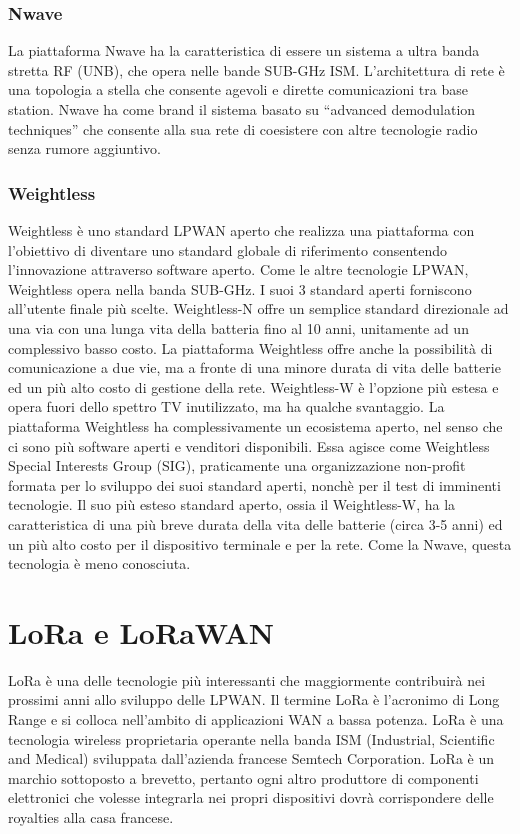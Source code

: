 \documentclass[12pt,a4paper,openright,twoside]{report}
\begin{document}
\subsection{Nwave}
La piattaforma Nwave ha la caratteristica di essere un sistema a ultra banda stretta RF (UNB), che opera nelle bande SUB-GHz ISM. 
L'architettura di rete \`e una topologia a stella che consente agevoli e dirette comunicazioni tra base station. Nwave ha come brand il sistema basato su ``advanced demodulation techniques'' che consente alla sua rete di coesistere con altre tecnologie radio senza rumore aggiuntivo\cite{K2}.

\subsection{Weightless}
Weightless \`e uno standard LPWAN aperto che realizza una piattaforma con l'obiettivo di diventare uno standard globale di riferimento consentendo l'innovazione attraverso software aperto. 
Come le altre tecnologie LPWAN, Weightless opera nella banda SUB-GHz. 
I suoi 3 standard aperti forniscono all'utente finale pi\`u scelte. 
Weightless-N offre un semplice standard direzionale ad una via con una lunga vita della batteria fino al 10 anni, unitamente ad un complessivo basso costo. La piattaforma Weightless offre anche la possibilit\`a di comunicazione a due vie, ma a fronte di una minore durata di vita delle batterie ed un pi\`u alto costo di gestione della rete. 
Weightless-W \`e l'opzione pi\`u estesa e opera fuori dello spettro TV inutilizzato, ma ha qualche svantaggio. 
La piattaforma Weightless ha complessivamente un ecosistema aperto, nel senso che ci sono pi\`u software aperti e venditori disponibili. Essa agisce come Weightless Special Interests Group (SIG), praticamente una organizzazione non-profit formata per lo sviluppo dei suoi standard aperti, nonch\`e per il test di imminenti tecnologie. Il suo pi\`u esteso standard aperto, ossia il Weightless-W, ha la caratteristica di una pi\`u breve durata della vita delle batterie (circa 3-5 anni) ed un pi\`u alto costo per il dispositivo terminale e per la rete. 
Come la Nwave, questa tecnologia \`e meno conosciuta\cite{K2}.


\chapter{LoRa e LoRaWAN}
LoRa \`e una delle tecnologie pi\`u interessanti che maggiormente contribuir\`a nei prossimi anni allo sviluppo delle LPWAN. Il termine LoRa \`e l'acronimo di Long Range  e si colloca nell'ambito di applicazioni WAN a bassa potenza.
LoRa \`e una tecnologia wireless proprietaria operante nella banda ISM (Industrial, Scientific and Medical) sviluppata dall'azienda francese Semtech Corporation. LoRa \`e un marchio sottoposto a brevetto, pertanto ogni altro produttore di componenti elettronici che volesse integrarla nei propri dispositivi dovr\`a corrispondere delle royalties alla casa francese. 
    
\end{document}

